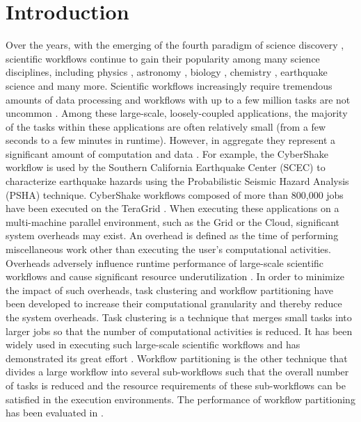 \chapter{Introduction}


Over the years, with the emerging of the fourth paradigm of science discovery \cite{Hey2009}, scientific workflows continue to gain their popularity among many science disciplines, including physics \cite{Deelman2002}, astronomy \cite{Sakellariou2010}, biology \cite{Lathers2006, Oinn2004}, chemistry \cite{Wieczorek2005}, earthquake science \cite{Maechling2007} and many more. Scientific workflows increasingly require tremendous amounts of data processing and workflows with up to a few million tasks are not uncommon \cite{Callaghan2011}. Among these large-scale, loosely-coupled applications, the majority of the tasks within these applications are often relatively small (from a few seconds to a few minutes in runtime). However, in aggregate they represent a significant amount of computation and data \cite{Deelman2002}. For example, the CyberShake workflow \cite{Rynge2012} is used by the Southern California Earthquake Center (SCEC) \cite{SCEC} to characterize earthquake hazards using the Probabilistic Seismic Hazard Analysis (PSHA) technique. CyberShake workflows composed of more than 800,000 jobs have been executed on the TeraGrid \cite{TeraGrid}. When executing these applications on a multi-machine parallel environment, such as the Grid or the Cloud, significant system overheads may exist. An overhead is defined as the time of performing miscellaneous work other than executing the user's computational activities.  Overheads adversely influence runtime performance of large-scale scientific workflows and cause significant resource underutilization \cite{Chen2011}. In order to minimize the impact of such overheads, task clustering \cite{Singh2008,Hussin2010,Zhao2009} and workflow partitioning \cite{Kumar2002, Hedayat2009} have been developed to increase their computational granularity and thereby reduce the system overheads. Task clustering is a technique that merges small tasks into larger jobs so that the number of computational activities is reduced. It has been widely used in executing such large-scale scientific workflows and has demonstrated its great effort \cite{Singh2008}. Workflow partitioning is the other technique that divides a large workflow into several sub-workflows such that the overall number of tasks is reduced and the resource requirements of these sub-workflows can be satisfied in the execution environments. The performance of workflow partitioning has been evaluated in \cite{Rynge2012}. 
 

